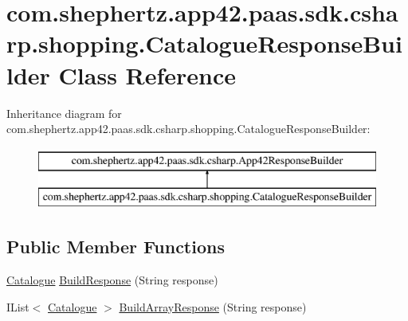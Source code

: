 \hypertarget{classcom_1_1shephertz_1_1app42_1_1paas_1_1sdk_1_1csharp_1_1shopping_1_1_catalogue_response_builder}{\section{com.\+shephertz.\+app42.\+paas.\+sdk.\+csharp.\+shopping.\+Catalogue\+Response\+Builder Class Reference}
\label{classcom_1_1shephertz_1_1app42_1_1paas_1_1sdk_1_1csharp_1_1shopping_1_1_catalogue_response_builder}
}
Inheritance diagram for com.\+shephertz.\+app42.\+paas.\+sdk.\+csharp.\+shopping.\+Catalogue\+Response\+Builder\+:\begin{figure}[H]
\begin{center}
\leavevmode
\includegraphics[height=2.000000cm]{classcom_1_1shephertz_1_1app42_1_1paas_1_1sdk_1_1csharp_1_1shopping_1_1_catalogue_response_builder}
\end{center}
\end{figure}
\subsection*{Public Member Functions}
\begin{DoxyCompactItemize}
\item 
\hyperlink{classcom_1_1shephertz_1_1app42_1_1paas_1_1sdk_1_1csharp_1_1shopping_1_1_catalogue}{Catalogue} \hyperlink{classcom_1_1shephertz_1_1app42_1_1paas_1_1sdk_1_1csharp_1_1shopping_1_1_catalogue_response_builder_a6b829fb587570fbd143688cf5c42f12c}{Build\+Response} (String response)
\item 
I\+List$<$ \hyperlink{classcom_1_1shephertz_1_1app42_1_1paas_1_1sdk_1_1csharp_1_1shopping_1_1_catalogue}{Catalogue} $>$ \hyperlink{classcom_1_1shephertz_1_1app42_1_1paas_1_1sdk_1_1csharp_1_1shopping_1_1_catalogue_response_builder_a08ee3b7b68550dba0ba17f8281528994}{Build\+Array\+Response} (String response)
\end{DoxyCompactItemize}


